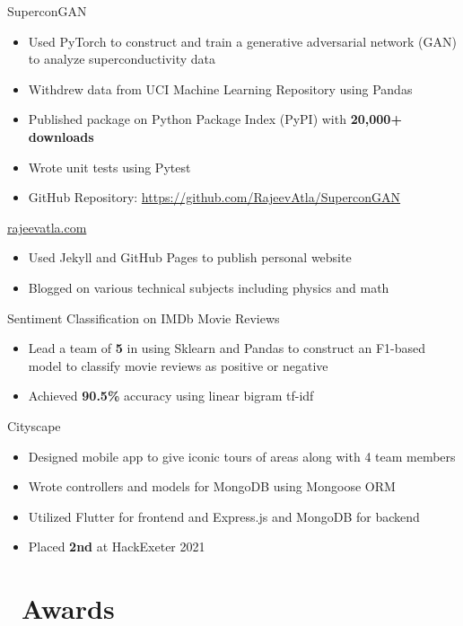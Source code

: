 \documentclass[12]{article}
\begin{document}
{SuperconGAN}
{
  \begin{itemize}
  \item Used PyTorch to construct and train a generative adversarial network (GAN) to analyze superconductivity data
  \item Withdrew data from UCI Machine Learning Repository using Pandas
  \item Published package on Python Package Index (PyPI) with \textbf{20,000+ downloads}
  \item Wrote unit tests using Pytest
  \item GitHub Repository: \url{https://github.com/RajeevAtla/SuperconGAN}
  \end{itemize}
}
\vspace{-1\baselineskip}
{\url{rajeevatla.com}}
{
  \begin{itemize}
  \item Used Jekyll and GitHub Pages to publish personal website
  \item Blogged on various technical subjects including physics and math
  \end{itemize}
}
\vspace{-1\baselineskip}
{Sentiment Classification on IMDb Movie Reviews}
{
  \begin{itemize}
  \item Lead a team of \textbf{5} in using Sklearn and Pandas to construct an F1-based model to classify movie reviews as positive or negative
  \item Achieved \textbf{90.5\%} accuracy using linear bigram tf-idf
  \end{itemize}
}
\vspace{-1\baselineskip}
{Cityscape}
{
  \begin{itemize}
  \item Designed mobile app to give iconic tours of areas along with 4 team members
  \item Wrote controllers and models for MongoDB using Mongoose ORM
  \item Utilized Flutter for frontend and Express.js and MongoDB for backend
  \item Placed \textbf{2nd} at HackExeter 2021
  \end{itemize}
}
\vspace{-1\baselineskip}

\section{\faAward\ Awards}
\end{document}
